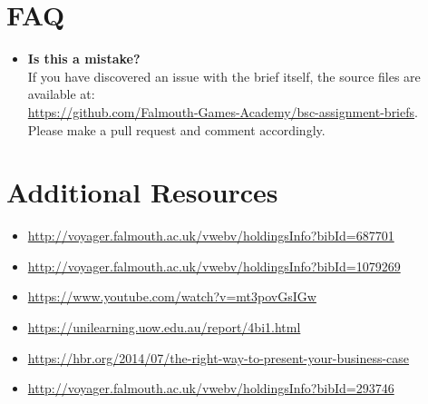 \documentclass{../../fal_assignment}
\begin{document}
\section*{FAQ}

\begin{itemize}    		
    	\item 	\textbf{Is this a mistake?} \\ 	
    		If you have discovered an issue with the brief itself, the source files are available at: \\
    		\url{https://github.com/Falmouth-Games-Academy/bsc-assignment-briefs}.\\
    		 Please make a pull request and comment accordingly.
\end{itemize}

\section*{Additional Resources}

\begin{itemize}
    \item \url{http://voyager.falmouth.ac.uk/vwebv/holdingsInfo?bibId=687701}
    \item \url{http://voyager.falmouth.ac.uk/vwebv/holdingsInfo?bibId=1079269}
    \item \url{https://www.youtube.com/watch?v=mt3povGsIGw}
    \item \url{https://unilearning.uow.edu.au/report/4bi1.html}
    \item \url{https://hbr.org/2014/07/the-right-way-to-present-your-business-case}
    \item \url{http://voyager.falmouth.ac.uk/vwebv/holdingsInfo?bibId=293746}
\end{itemize}

\rubricyeartwo
\end{document}
